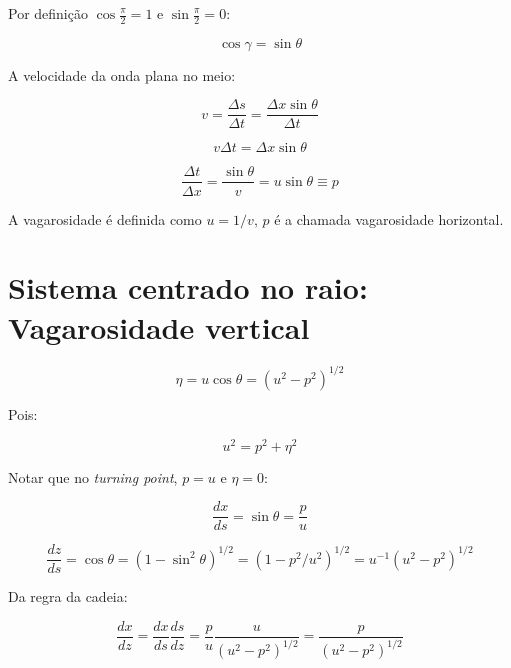 \documentclass[a4paper, 12pt]{article}
\begin{document}
Por definição $\cos \frac{\pi}{2} = 1$ e $\sin \frac{\pi}{2} = 0$:

\begin{equation}
\label{eq:1.5}
\cos \gamma = \sin \theta
\end{equation}

A velocidade da onda plana no meio:

\begin{equation}
 \label{eq:1.6}
 v = \frac{\Delta s}{\Delta t} = \frac{\Delta x \sin \theta}{\Delta t}
\end{equation}

\begin{equation}
 \label{eq:1.7}
 v \Delta t = \Delta x \sin \theta
\end{equation}

\begin{equation}
 \label{eq:1.8}
 \frac{\Delta t}{\Delta x} = \frac{\sin \theta}{v} = u \sin \theta \equiv p
\end{equation}

A vagarosidade é definida como $u=1/v$, $p$ é a chamada vagarosidade horizontal.

\section{Sistema centrado no raio: Vagarosidade vertical}

\begin{equation}
 \label{eq:1.9}
 \eta = u \cos \theta = (u^2 - p^2)^{1/2}
\end{equation}

Pois:

\begin{equation}
 \label{eq:1.10}
 u^2 = p^2 + \eta^2
\end{equation}

Notar que no \textit{turning point}, $p=u$ e $\eta=0$:


\begin{equation}
 \label{eq:1.11}
 \frac{dx}{ds} = \sin \theta = \frac{p}{u}
\end{equation}

\begin{equation}
 \label{eq:1.12}
 \frac{dz}{ds} = \cos \theta = (1 - \sin^2\theta)^{1/2} = (1 - p^2/u^2)^{1/2} = u^{-1}(u^2 - p^2)^{1/2}
\end{equation}

Da regra da cadeia:

\begin{equation}
 \label{eq:1.13}
 \frac{dx}{dz} = \frac{dx}{ds} \frac{ds}{dz} = \frac{p}{u} \frac{u}{(u^2-p^2)^{1/2}} = \frac{p}{(u^2-p^2)^{1/2}}
\end{equation}
\end{document}

